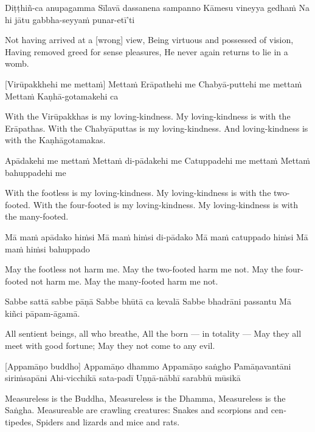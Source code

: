Diṭṭhiñ-ca anupagamma
Sīlavā dassanena sampanno
Kāmesu vineyya gedhaṁ
Na hi jātu gabbha-seyyaṁ punar-etī’ti

\begin{english}
  Not having arrived at a [wrong] view,
  Being virtuous and possessed of vision,
  Having removed greed for sense pleasures,
  He never again returns to lie in a womb.
\end{english}

\suttaRef{[Snp 1.8]}

[Virūpakkhehi me mettaṁ]
Mettaṁ Erāpathehi me
Chabyā-puttehi me mettaṁ
Mettaṁ Kaṇhā-gotamakehi ca

\begin{english}
  With the Virūpakkhas is my loving-kindness.
  My loving-kindness is with the Erāpathas.
  With the Chabyāputtas is my loving-kindness.
  And loving-kindness is with the Kaṇhāgotamakas.
\end{english}

Apādakehi me mettaṁ
Mettaṁ di-pādakehi me
Catuppadehi me mettaṁ
Mettaṁ bahuppadehi me

\begin{english}
  With the footless is my loving-kindness.
  My loving-kindness is with the two-footed.
  With the four-footed is my loving-kindness.
  My loving-kindness is with the many-footed.
\end{english}

Mā maṁ apādako hiṁsi
Mā maṁ hiṁsi di-pādako
Mā maṁ catuppado hiṁsi
Mā maṁ hiṁsi bahuppado

\begin{english}
  May the footless not harm me.
  May the two-footed harm me not.
  May the four-footed not harm me.
  May the many-footed harm me not.
\end{english}

Sabbe sattā sabbe pāṇā
Sabbe bhūtā ca kevalā
Sabbe bhadrāni passantu
Mā kiñci pāpam-āgamā.

\begin{english}
  All sentient beings, all who breathe,
  All the born — in totality —
  May they all meet with good fortune;
  May they not come to any evil.
\end{english}

[Appamāṇo buddho]
Appamāṇo dhammo
Appamāṇo saṅgho
Pamāṇavantāni siriṁsapāni
Ahi-vicchikā sata-padī
Uṇṇā-nābhī sarabhū mūsikā

\begin{english}
  Measureless is the Buddha,
  Measureless is the Dhamma,
  Measureless is the Saṅgha.
  Measureable are crawling creatures:
  Snakes and scorpions and centipedes,
  Spiders and lizards and mice and rats.
\end{english}

